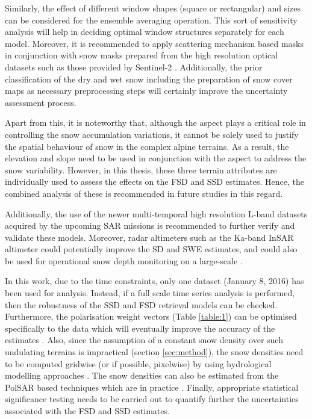 \documentclass[review]{elsarticle}
\numberwithin{equation}{section}
\numberwithin{figure}{section}
\numberwithin{table}{section}
\begin{document}
Similarly, the effect of different window shapes (square or rectangular) and sizes can be considered for the ensemble averaging operation. This sort of sensitivity analysis will help in deciding optimal window structures separately for each model. Moreover, it is recommended to apply scattering mechanism based masks in conjunction with snow masks prepared from the high resolution optical datasets such as those provided by Sentinel-2 \citep{Zhu2015}. Additionally, the prior classification of the dry and wet snow including the preparation of snow cover maps \citep{Leinss2018, Thakur2012, Zhu2015} as necessary preprocessing steps will certainly improve the uncertainty assessment process.

Apart from this, it is noteworthy that, although the aspect plays a critical role in controlling the snow accumulation variations, it cannot be solely used to justify the spatial behaviour of snow in the complex alpine terrains. As a result, the elevation and slope need to be used in conjunction with the aspect to address the snow variability. However, in this thesis, these three terrain attributes are individually used to assess the effects on the FSD and SSD estimates. Hence, the combined analysis of these is recommended in future studies in this regard.

Additionally, the use of the newer multi-temporal high resolution L-band datasets acquired by the upcoming SAR missions \citep{Krieger2016, Rosen2017} is recommended to further verify and validate these models. Moreover, radar altimeters such as the Ka-band InSAR altimeter could potentially improve the SD and SWE estimates, and could also be used for operational snow depth monitoring on a large-scale \citep{Hensley2016, Kim2018, Moller2011, Speziali2018}.

In this work, due to the time constraints, only one dataset (January 8, 2016) has been used for analysis. Instead, if a full scale time series analysis is performed, then the robustness of the SSD and FSD retrieval models can be checked. Furthermore, the polarisation weight vectors (Table \ref{table:1}) can be optimised specifically to the data which will eventually improve the accuracy of the estimates \citep{Cloude2005, Cloude2010}. Also, since the assumption of a constant snow density over such undulating terrains is impractical (section \ref{sec:method}), the snow densities need to be computed gridwise (or if possible, pixelwise) by using hydrological modelling approaches \citep{Bartelt2002, Liang1994}. The snow densities can also be estimated from the PolSAR based techniques which are in practice \citep{Singh2017, Thakur2012}. Finally, appropriate statistical significance testing needs to be carried out to quantify further the uncertainties associated with the FSD and SSD estimates.
\end{document}
